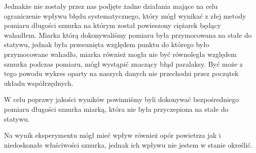 \documentclass[a4paper,12pt]{article}
\begin{document}
Jednakże nie zostały przez nas podjęte żadne działania mające na celu ograniczenie wpływu błędu systematycznego, który mógł wynikać
z złej metody pomiaru długości sznurka na którym został powieszony ciężarek będący wahadłem. Miarka którą dokonywaliśmy pomiaru była
przymocowana na stałe do statywu, jednak była przesunięta względem punktu do którego było przymocowane wahadło, miarka również
mogła nie być równoległa względem sznurka podczas pomiaru, mógł wystąpić znaczący błąd paralaksy. Być może z tego powodu wykres
oparty na naszych danych nie przechodzi przez początek układu współrzędnych.

W celu poprawy jakości wyników powinniśmy byli dokonywać bezpośredniego pomiaru długości sznurka miarką, która nie była przyczepiona
na stałe do statywu.

Na wynik eksperymentu mógł mieć wpływ również opór powietrza jak i niedoskonałe właściwości sznurka, jednak ich wpływu nie jestem w
stanie określić.
\listoftables
\listoffigures
\end{document}
